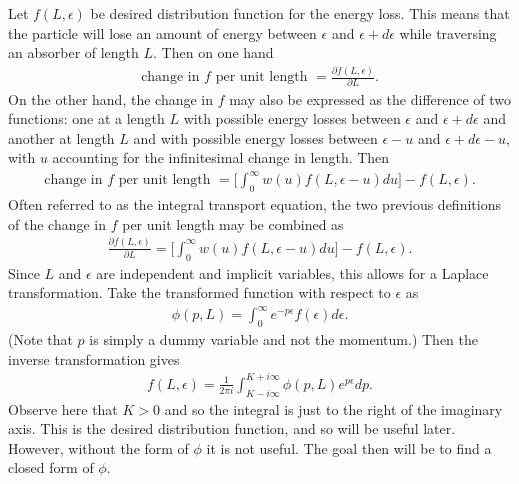 Let $f(L,\epsilon)$ be desired distribution function for the energy loss. This means that the particle will lose an amount of energy between $\epsilon$ and $\epsilon+d\epsilon$ while traversing an absorber of length $L$. Then on one hand
\begin{align*}
\text{change in $f$ per unit length }=\frac{\partial f(L,\epsilon)}{\partial L}.
\end{align*}
On the other hand, the change in $f$ may also be expressed as the difference of two functions: one at a length $L$ with possible energy losses between $\epsilon$ and $\epsilon+d\epsilon$ and another at length $L$ and with possible energy losses between $\epsilon-u$ and $\epsilon+d\epsilon-u$, with $u$ accounting for the infinitesimal change in length. Then
\begin{align*}
\text{change in $f$ per unit length }=\Bigg [\int_0 ^\infty w(u) f(L,\epsilon-u) du \Bigg] - f(L,\epsilon).
\end{align*}
Often referred to as the integral transport equation, the two previous definitions of the change in $f$ per unit length may be combined as
\begin{align}\label{eqn:Landau1}
\frac{\partial f(L,\epsilon)}{\partial L} = \Bigg [\int_0 ^\infty w(u) f(L,\epsilon-u) du \Bigg] - f(L,\epsilon).
\end{align}
Since $L$ and $\epsilon$ are independent and implicit variables, this allows for a Laplace transformation. Take the transformed function with respect to $\epsilon$ as 
\begin{align*}
\phi(p,L)=\int_0 ^\infty e^{-p \epsilon} f(\epsilon) d\epsilon.
\end{align*}
(Note that $p$ is simply a dummy variable and not the momentum.)
%
Then the inverse transformation gives
\begin{align} \label{eqn:LandauInverseTransformation}
f(L,\epsilon)=\frac{1}{2\pi i} \int_{K-i \infty} ^{K+i\infty} \phi(p,L) e^{p\epsilon} dp.
\end{align}
Observe here that $K>0$ and so the integral is just to the right of the imaginary axis. This is the desired distribution function, and so will be useful later. However, without the form of $\phi$ it is not useful. The goal then will be to find a closed form of $\phi$.

